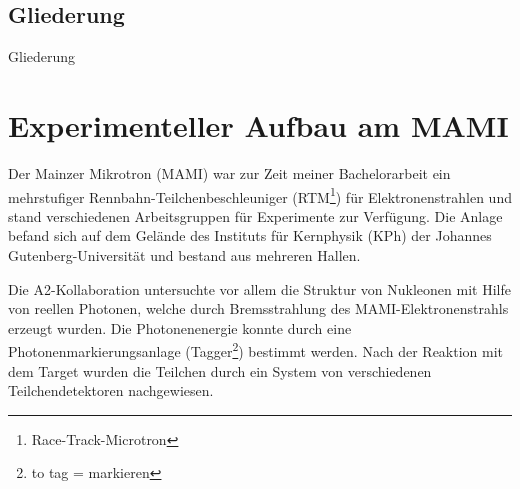 \documentclass[a4paper,11pt,oneside,final,german,openbib,pdftex]{scrbook}
\begin{document}
{	
\section{Gliederung}
Gliederung





\chapter{Experimenteller Aufbau am MAMI}





Der Mainzer Mikrotron (MAMI) war zur Zeit meiner Bachelorarbeit ein mehrstufiger Rennbahn-Teilchenbeschleuniger (RTM\footnote{Race-Track-Microtron}) für Elektronenstrahlen und stand verschiedenen Arbeitsgruppen für Experimente zur Verfügung. Die Anlage befand sich auf dem Gelände des Instituts für Kernphysik (KPh) der Johannes Gutenberg-Universität 
und bestand aus mehreren Hallen.

Die A2-Kollaboration untersuchte vor allem die Struktur von Nukleonen mit Hilfe von reellen Photonen, welche durch Bremsstrahlung des MAMI-Elektronenstrahls erzeugt wurden. Die Photonenenergie konnte durch eine Photonenmarkierungsanlage (Tagger\footnote{to tag = markieren}) bestimmt werden. Nach der Reaktion mit dem Target wurden die Teilchen durch ein System von verschiedenen Teilchendetektoren nachgewiesen.

}
\end{document}
